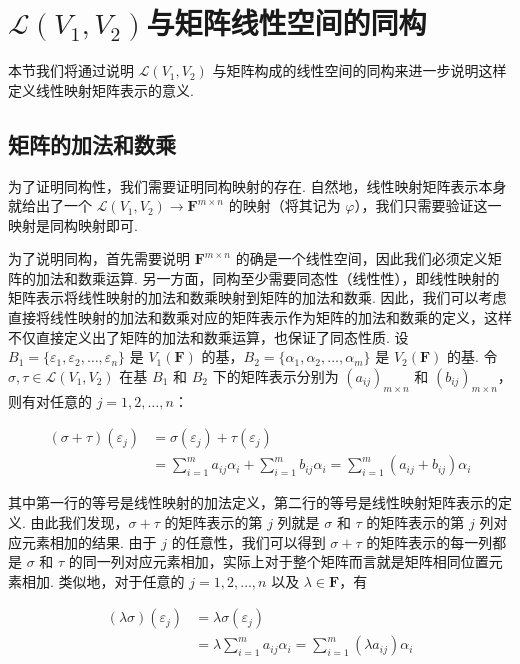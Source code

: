 \section{$\mathcal{L}(V_1,V_2)$与矩阵线性空间的同构}

本节我们将通过说明 $\mathcal{L}(V_1,V_2)$ 与矩阵构成的线性空间的同构来进一步说明这样定义线性映射矩阵表示的意义.

\subsection{矩阵的加法和数乘}

为了证明同构性，我们需要证明同构映射的存在. 自然地，线性映射矩阵表示本身就给出了一个 $\mathcal{L}(V_1,V_2) \to \mathbf{F}^{m \times n}$ 的映射（将其记为 $\varphi$），我们只需要验证这一映射是同构映射即可.

为了说明同构，首先需要说明 $\mathbf{F}^{m \times n}$ 的确是一个线性空间，因此我们必须定义矩阵的加法和数乘运算. 另一方面，同构至少需要同态性（线性性），即线性映射的矩阵表示将线性映射的加法和数乘映射到矩阵的加法和数乘. 因此，我们可以考虑直接将线性映射的加法和数乘对应的矩阵表示作为矩阵的加法和数乘的定义，这样不仅直接定义出了矩阵的加法和数乘运算，也保证了同态性质. 设 $B_1 = \{\varepsilon_1,\varepsilon_2,\ldots,\varepsilon_n\}$ 是 $V_1(\mathbf{F})$ 的基，$B_2 = \{\alpha_1,\alpha_2,\ldots,\alpha_m\}$ 是 $V_2(\mathbf{F})$ 的基. 令 $\sigma, \tau \in \mathcal{L}(V_1,V_2)$ 在基 $B_1$ 和 $B_2$ 下的矩阵表示分别为 $(a_{ij})_{m \times n}$ 和 $(b_{ij})_{m \times n}$，则有对任意的 $j = 1, 2, \ldots, n$：

\begin{align*}
    (\sigma + \tau)(\varepsilon_j) & = \sigma(\varepsilon_j) + \tau(\varepsilon_j) \\
    &= \sum_{i=1}^m a_{ij}\alpha_i + \sum_{i=1}^m b_{ij}\alpha_i = \sum_{i=1}^m (a_{ij} + b_{ij})\alpha_i
\end{align*}

其中第一行的等号是线性映射的加法定义，第二行的等号是线性映射矩阵表示的定义. 由此我们发现，$\sigma + \tau$ 的矩阵表示的第 $j$ 列就是 $\sigma$ 和 $\tau$ 的矩阵表示的第 $j$ 列对应元素相加的结果. 由于 $j$ 的任意性，我们可以得到 $\sigma + \tau$ 的矩阵表示的每一列都是 $\sigma$ 和 $\tau$ 的同一列对应元素相加，实际上对于整个矩阵而言就是矩阵相同位置元素相加. 类似地，对于任意的 $j = 1, 2, \ldots, n$ 以及 $\lambda \in \mathbf{F}$，有

\begin{align*}
    (\lambda \sigma)(\varepsilon_j) & = \lambda \sigma(\varepsilon_j) \\
    &= \lambda \sum_{i=1}^m a_{ij}\alpha_i = \sum_{i=1}^m (\lambda a_{ij})\alpha_i
\end{align*}

